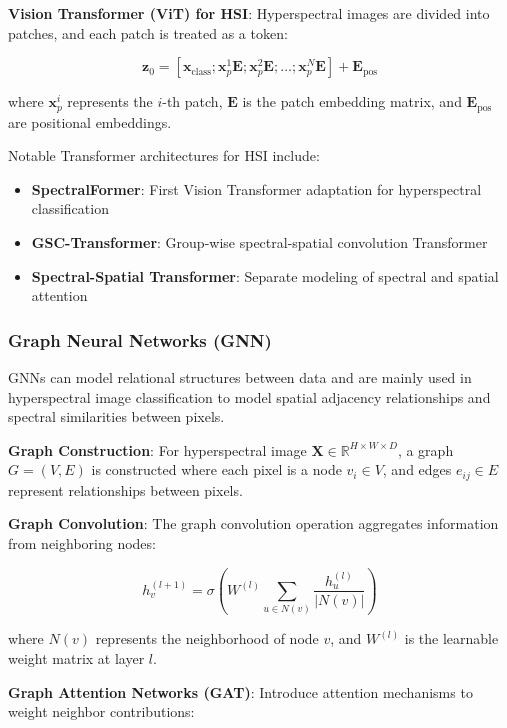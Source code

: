 \documentclass[journal]{IEEEtran}
\begin{document}
\textbf{Vision Transformer (ViT) for HSI}: Hyperspectral images are divided into patches, and each patch is treated as a token:

\begin{equation}
\mathbf{z}_0 = [\mathbf{x}_{\text{class}}; \mathbf{x}_p^1\mathbf{E}; \mathbf{x}_p^2\mathbf{E}; \ldots; \mathbf{x}_p^N\mathbf{E}] + \mathbf{E}_{\text{pos}}
\end{equation}

where $\mathbf{x}_p^i$ represents the $i$-th patch, $\mathbf{E}$ is the patch embedding matrix, and $\mathbf{E}_{\text{pos}}$ are positional embeddings.

Notable Transformer architectures for HSI include:
\begin{itemize}
\item \textbf{SpectralFormer}: First Vision Transformer adaptation for hyperspectral classification
\item \textbf{GSC-Transformer}: Group-wise spectral-spatial convolution Transformer
\item \textbf{Spectral-Spatial Transformer}: Separate modeling of spectral and spatial attention
\end{itemize}

\subsubsection{Graph Neural Networks (GNN)}

GNNs can model relational structures between data and are mainly used in hyperspectral image classification to model spatial adjacency relationships and spectral similarities between pixels.

\textbf{Graph Construction}: For hyperspectral image $\mathbf{X} \in \mathbb{R}^{H \times W \times D}$, a graph $G = (V, E)$ is constructed where each pixel is a node $v_i \in V$, and edges $e_{ij} \in E$ represent relationships between pixels.

\textbf{Graph Convolution}: The graph convolution operation aggregates information from neighboring nodes:

\begin{equation}
h_v^{(l+1)} = \sigma\left(W^{(l)} \sum_{u \in N(v)} \frac{h_u^{(l)}}{|N(v)|}\right)
\end{equation}

where $N(v)$ represents the neighborhood of node $v$, and $W^{(l)}$ is the learnable weight matrix at layer $l$.

\textbf{Graph Attention Networks (GAT)}: Introduce attention mechanisms to weight neighbor contributions:
\end{document}
